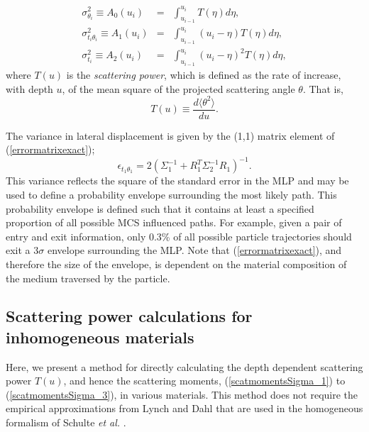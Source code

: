\documentclass[preprint,times]{elsarticle}
\newcommand{\Eqn}[1]{(#1)} %
\begin{document}
\begin{eqnarray}
\sigma_{\theta_i}^2 \equiv A_0(u_i) &=& \int_{u_{i-1}}^{u_i} T(\eta)d\eta, \label{scatmomentsSigma_1}\\
\sigma_{t_i\theta_i}^2 \equiv A_1(u_i) &=& \int_{u_{i-1}}^{u_i} (u_i-\eta)T(\eta)d\eta, \label{scatmomentsSigma_2}\\
\sigma_{t_i}^2 \equiv A_2(u_i) &=& \int_{u_{i-1}}^{u_i} (u_i-\eta)^2 T(\eta)d\eta, \label{scatmomentsSigma_3}
\end{eqnarray}
where $T(u)$ is the \emph{scattering power}, which is defined as the rate of increase, with depth $u$, of the mean square of the projected scattering angle $\theta$. That is, 
\begin{equation} 
T(u) \equiv \frac{d\langle \theta^2 \rangle}{du}.\label{scatpower1}
\end{equation}

The variance in lateral displacement is given by the (1,1) matrix element of \Eqn{\ref{errormatrixexact}};
\begin{equation}
 \epsilon_{t_1\theta_1} = 2\left(\Sigma_1^{-1} + R_1^T\Sigma_2^{-1}R_1\right)^{-1}. \label{errormatrixexact}
\end{equation}
This variance reflects the square of the standard error in the MLP and may be used to define a probability envelope surrounding the most likely path. This probability envelope is defined such that it contains at least a specified proportion of all possible MCS influenced paths. For example, given a pair of entry and exit information, only 0.3\% of all possible particle trajectories should exit a $3\sigma$ envelope surrounding the MLP. Note that \Eqn{\ref{errormatrixexact}}, and therefore the size of the envelope, is dependent on the material composition of the medium traversed by the particle.


\subsection{Scattering power calculations for inhomogeneous materials}\label{scatteringpowersection}

Here, we present a method for directly calculating the depth dependent scattering power $T(u)$, and hence the scattering moments, \Eqn{\ref{scatmomentsSigma_1}} to \Eqn{\ref{scatmomentsSigma_3}}, in various materials. This method does not require the empirical approximations from Lynch and Dahl \citep{lynchdahl} that are used in the homogeneous formalism of Schulte \emph{et al.} \citep{penfoldMLP}.
\end{document}

